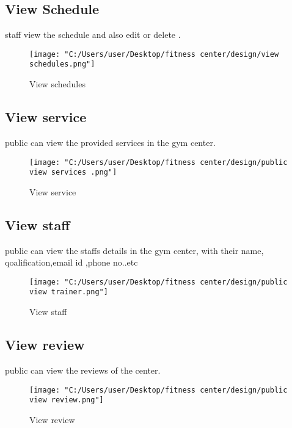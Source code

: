 \documentclass[a4paper,12pt,toc=flat]{report}
\begin{document}
{{	\subsection{View Schedule}
	 \hspace*{12pt} staff view the schedule and also edit or delete .
	\begin{figure}[bph]
		\begin{center}
			\texttt{[image: "C:/Users/user/Desktop/fitness center/design/view schedules.png"]}
		\end{center}
		\caption{View schedules}
	\end{figure}			
	\pagebreak		
	\subsection{View service }
	 \hspace*{12pt} public can view the provided services in the gym center.
	\begin{figure}[bph]
		\begin{center}
			\texttt{[image: "C:/Users/user/Desktop/fitness center/design/public view services .png"]}
		\end{center}
		\caption{View service}
	\end{figure}
	\subsection{View staff}
	 \hspace*{12pt} public can view the staffs details in the gym center, with their name, qoalification,email id ,phone no..etc
	\begin{figure}[bph]
		\begin{center}
			\texttt{[image: "C:/Users/user/Desktop/fitness center/design/public view trainer.png"]}
		\end{center}
		\caption{View staff}
	\end{figure}			
	\pagebreak	
	
	\subsection{View review }
	 \hspace*{12pt} public can view the reviews of the center.
	\begin{figure}[bph]
		\begin{center}
			\texttt{[image: "C:/Users/user/Desktop/fitness center/design/public view review.png"]}
		\end{center}
		\caption{View review}
	\end{figure}
}}
\end{document}
